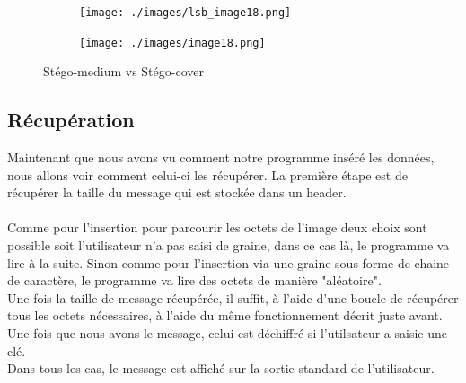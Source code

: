 \documentclass[letterpaper,12pt, french]{article}
\begin{document}
\begin{figure}[!h]
    \centering
    \begin{subfigure}[b]{0.3\textwidth}
        \texttt{[image: ./images/lsb\_image18.png]}
    \end{subfigure}
    \begin{subfigure}[b]{0.3\textwidth}
        \texttt{[image: ./images/image18.png]}
    \end{subfigure}
    \caption{Stégo-medium vs Stégo-cover}
\end{figure}

\clearpage

\subsection{Récupération}
\label{sec:orge5b0aab}

Maintenant que nous avons vu comment notre programme inséré les données, nous allons voir comment celui-ci les récupérer. La première étape est de récupérer la taille du message qui est stockée dans un header. 
\\
\\
Comme pour l'insertion pour parcourir les octets de l'image deux choix sont possible soit l'utilisateur n'a pas saisi de graine, dans ce cas là, le programme va lire à la suite. Sinon comme pour l'insertion via une graine sous forme de chaine de caractère, le programme va lire des octets de manière "aléatoire".
\vspace{1\baselineskip}
\\
Une fois la taille de message récupérée, il suffit, à l'aide d'une boucle de récupérer tous les octets nécessaires, à l'aide du même fonctionnement décrit juste avant. Une fois que nous avons le message, celui-est déchiffré si l'utilsateur a saisie une clé. 
\vspace{1\baselineskip}
\\
Dans tous les cas, le message est affiché sur la sortie standard de l'utilisateur.

\clearpage
\end{document}
